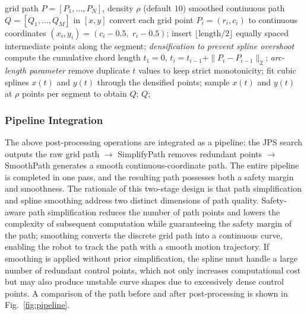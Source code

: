 \documentclass[pdflatex,sn-basic,Numbered]{sn-jnl}
\begin{document}
\begin{algorithm}[!t]
\caption{Arc-length parameterized cubic spline smoothing}
\label{alg:smooth}

\begin{algorithmic}[1]
\Require grid path $P = [P_1, \ldots, P_N]$, density $\rho$ (default $10$)
\Ensure smoothed continuous path $Q = [Q_1, \ldots, Q_M]$ in $[x, y]$
\State convert each grid point $P_i = (r_i, c_i)$ to continuous coordinates $(x_i, y_i) = (c_i - 0.5,\; r_i - 0.5)$;
\State insert $\lfloor \mathrm{length} / 2 \rfloor$ equally spaced intermediate points along the segment; \quad\textit{densification to prevent spline overshoot}
\EndFor
\State compute the cumulative chord length $t_1 = 0$, $t_i = t_{i-1} + \|P_i - P_{i-1}\|_2$; \quad\textit{arc-length parameter}
\State remove duplicate $t$ values to keep strict monotonicity;
\State fit cubic splines $x(t)$ and $y(t)$ through the densified points;
\State sample $x(t)$ and $y(t)$ at $\rho$ points per segment to obtain $Q$;
\State\Return $Q$;
\end{algorithmic}

\end{algorithm}

\subsubsection{Pipeline Integration}

The above post-processing operations are integrated as a pipeline: the JPS search outputs the raw grid path $\to$ SimplifyPath removes redundant points $\to$ SmoothPath generates a smooth continuous-coordinate path. The entire pipeline is completed in one pass, and the resulting path possesses both a safety margin and smoothness. The rationale of this two-stage design is that path simplification and spline smoothing address two distinct dimensions of path quality. Safety-aware path simplification reduces the number of path points and lowers the complexity of subsequent computation while guaranteeing the safety margin of the path; smoothing converts the discrete grid path into a continuous curve, enabling the robot to track the path with a smooth motion trajectory. If smoothing is applied without prior simplification, the spline must handle a large number of redundant control points, which not only increases computational cost but may also produce unstable curve shapes due to excessively dense control points. A comparison of the path before and after post-processing is shown in Fig.~\ref{fig:pipeline}.
\end{document}
